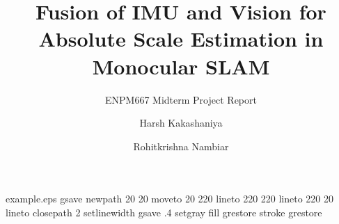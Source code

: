 %
%
%
%
%
\begin{filecontents*}{example.eps}
gsave
newpath
  20 20 moveto
  20 220 lineto
  220 220 lineto
  220 20 lineto
closepath
2 setlinewidth
gsave
  .4 setgray fill
grestore
stroke
grestore
\end{filecontents*}
%
\RequirePackage{fix-cm}
%
\documentclass[smallextended]{svjour3}       %
%
\smartqed  %
%
\usepackage{graphicx}
\usepackage{float}
\usepackage{amsmath}
\usepackage{algorithm}
\usepackage{algorithmic}
\usepackage{url}
%
%
%
%
%


\title{Fusion of IMU and Vision for Absolute Scale 
Estimation in Monocular SLAM%
}
\subtitle{ENPM667 Midterm Project Report}


\author{Harsh Kakashaniya         \and
        Rohitkrishna Nambiar%
}

